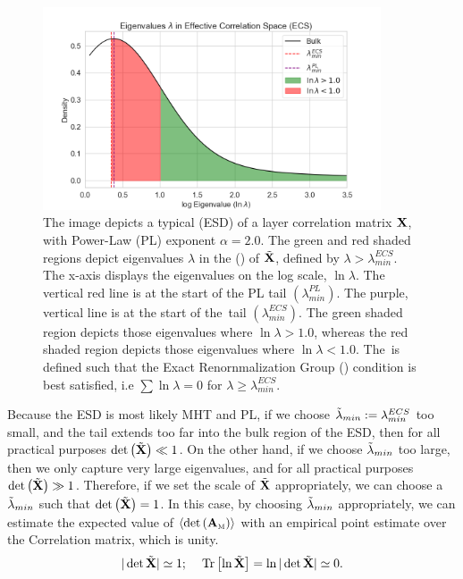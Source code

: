 \begin{figure}[t]
  \begin{center}
  \includegraphics[width=10cm]{./img/ECS_space.png}
  \caption{The image depicts a typical
    \EmpiricalSpectralDensity (ESD) of a layer correlation matrix $\mathbf{X}$, with \WW Power-Law (PL) exponent
    $\alpha=2.0$.%
    The green and red shaded regions depict
    eigenvalues $\lambda$ in the \EffectiveCorrelationSpace (\ECS) of $\tilde{\mathbf{X}}$, defined by $\lambda>\lambda_{min}^{ECS}$.
    The x-axis displays the eigenvalues on the log scale, $\ln\lambda$.
    The vertical red line is at the start of the PL tail  $(\lambda_{min}^{PL})$.
    The purple, vertical line is at the start of the~\ECS tail  $(\lambda_{min}^{ECS})$.
    The green shaded region depicts those eigenvalues where $\ln\lambda>1.0$,
    whereas the red shaded region depicts those eigenvalues where $\ln\lambda<1.0$.
    The~\ECS is defined such that the Exact Renornmalization Group (\TRACELOG) condition is best satisfied, i.e $\sum\ln\lambda= 0$ for $\lambda\ge\lambda_{min}^{ECS}$.
    }
  \end{center}
  \label{fig:ECS_space}
\end{figure}

Because the \Teacher ESD is most likely MHT and PL, 
if we choose ${\tilde{\lambda}_{min}}:=\lambda_{min}^{ECS}$ too small, and the tail extends too far into the bulk region of the ESD,
then for all practical purposes $\mbox{}{\text{det}}\left(\tilde{\mathbf{X}}\right)\ll 1$.
On the other hand, if we choose ${\tilde{\lambda}_{min}}$ too large,
then we only capture very large eigenvalues, and for all practical purposes $\mbox{}{\text{det}}\left(\tilde{\mathbf{X}}\right) \gg 1$.
Therefore, if we set the scale of $\tilde{\mathbf{X}}$ appropriately, we can choose a ${\tilde{\lambda}_{min}}$ such that $\mbox{}{\text{det}}\left(\tilde{\mathbf{X}}\right)=1$.
In this case, by choosing ${\tilde{\lambda}_{min}}$ appropriately, we can estimate the expected value of
$\langle\mbox{}{\text{det}}\left({\mathbf{A}}_{\text{\tiny M}}\right)\rangle$  with an empirical point estimate over the \Teacher Correlation matrix, which is unity.
\begin{equation}
\label{eqn:detX}
\vert\det\tilde{\mathbf{X}}\vert \simeq 1 ; \quad \mbox{}\operatorname{Tr}\left[ \ln\tilde{\mathbf{X}} \right] = \ln\vert\det\tilde{\mathbf{X}}\vert \simeq 0  .
\end{equation} 

